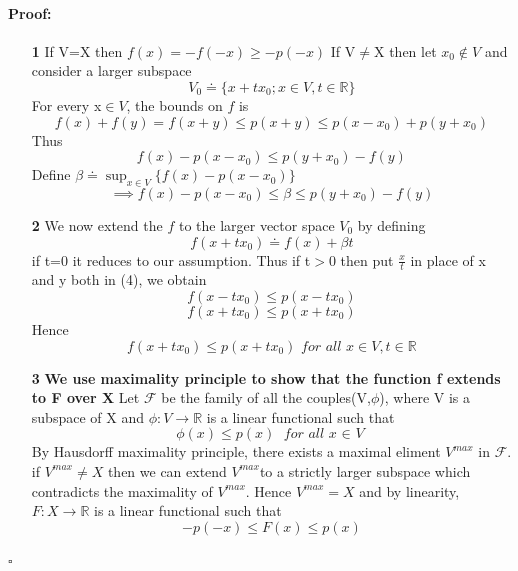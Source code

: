 \documentclass{article}
\newenvironment{proof}{\paragraph{Proof:}}{\hfill$\square$}
\begin{document}
\begin{proof}
    \begin{enumerate}
        \item[\textbf{1}] If V=X then $f(x)=-f(-x)$$\geq -p(-x)$
        If V$\not= $X then let $x_0\notin V $ and consider a larger subspace $$V_0 \doteq \{ x+tx_0 ; x \in V, t\in \mathbb{R} \}$$
        For every x$\in V$, the bounds on $f$ is $$f(x)+f(y)=f(x+y)\leq p(x+y)\leq p(x-x_0)+p(y+x_0) $$
        Thus $$f(x)-p(x-x_0)\leq p(y+x_0)-f(y)$$
        Define $\beta \doteq \sup_{x\in V} \{  f(x)-p(x-x_0)\}$
        \begin{equation}
            \implies f(x)-p(x-x_0)\leq \beta \leq  p(y+x_0)-f(y)  
        \end{equation}
    
        \item[\textbf{2}] We now extend the $f$ to the larger vector space $V_0$ by defining 
         $$f(x+tx_0)\doteq f(x)+\beta t$$
        if t=0 it reduces to our assumption. 
        Thus if t$>0$ then put $\frac{x}{t}$ in place of x and y both in (4), we obtain $$f(x-tx_0) \leq p(x-tx_0)$$
        $$f(x+tx_0)\leq p(x+tx_0)$$
        Hence $$f(x+tx_0)\leq p(x+tx_0)  \textit{      for all $x \in V, t \in \mathbb{R}  $}$$ 
        \item[\textbf{3}] \textbf{We use maximality principle to show that the function f extends to F over X} 
        Let $\mathcal{F} $ be the family of all the couples(V,$\phi$), where V is a subspace of X and $\phi: V \to \mathbb{R}  $ is a linear functional such that $$\phi(x)\leq p(x) \textit{                  for all x $\in$ V}$$
        By Hausdorff maximality principle, there exists a maximal eliment $V^{max}$ in $\mathcal{F} $. if $V^{max} \not= X$ then we can extend $V^{max } $to a strictly larger subspace which contradicts the maximality of $V^{max}$. Hence $V^{max } = X $ and by linearity, $F:X \to \mathbb{R} $ is a linear functional such that $$-p(-x)\leq F(x)\leq p(x)$$            
    \end{enumerate}
    

\end{proof}
\end{document}
